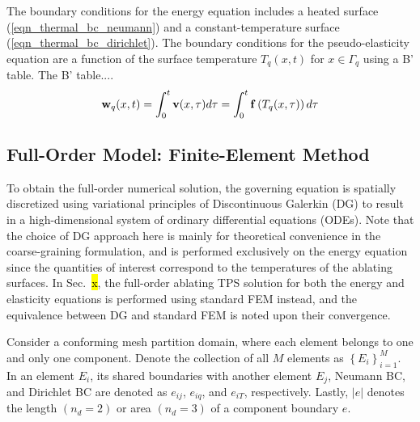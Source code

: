The boundary conditions for the energy equation includes a heated surface (\cref{eqn_thermal_bc_neumann}) and a constant-temperature surface (\cref{eqn_thermal_bc_dirichlet}). The boundary conditions for the pseudo-elasticity equation are a function of the surface temperature $T_q(x,t)$ for $x\in\Gamma_q$ using a B' table. The B' table....
\begin{equation}
    \mathbf{w}_q(x,t) = \int_{0}^{t} \mathbf{v}(x,\tau)d\tau = \int_{0}^{t}\mathbf{f}\left(T_q(x,\tau)\right)d\tau\label{eqn_boundary_displacement}
\end{equation}

\subsection{Full-Order Model: Finite-Element Method}\label{sec_fom}

To obtain the full-order numerical solution, the governing equation is spatially discretized using variational principles of Discontinuous Galerkin (DG) to result in a high-dimensional system of ordinary differential equations (ODEs). Note that the choice of DG approach here is mainly for theoretical convenience in the coarse-graining formulation, and is performed exclusively on the energy equation since the quantities of interest correspond to the temperatures of the ablating surfaces. In Sec.~\hl{x}, the full-order ablating TPS solution for both the energy and elasticity equations is performed using standard FEM instead, and the equivalence between DG and standard FEM is noted upon their convergence.

Consider a conforming mesh partition domain, where each element belongs to one and only one component. Denote the collection of all $M$ elements as $\left\{E_i\right\}_{i=1}^{M}$. In an element $E_i$, its shared boundaries with another element $E_j$, Neumann BC, and Dirichlet BC are denoted as $e_{ij}$, $e_{iq}$, and $e_{iT}$, respectively. Lastly, $\left|e\right|$ denotes the length $(n_d=2)$ or area $(n_d=3)$ of a component boundary $e$.

